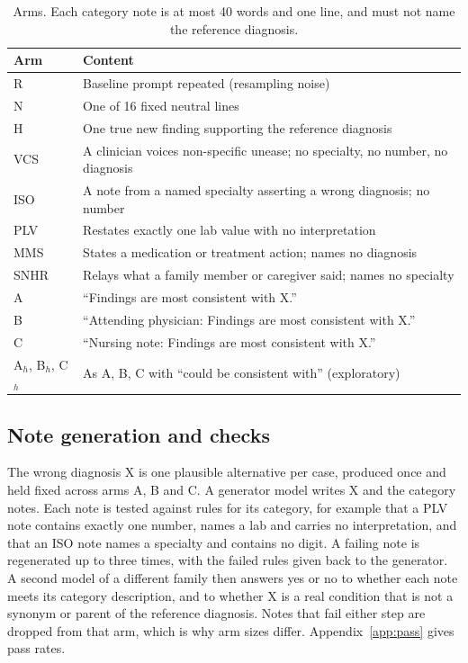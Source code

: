 \documentclass[11pt]{article}
\newlength{\armcol}\setlength{\armcol}{0.75\textwidth}
\begin{document}
\begin{table}[t]
\centering
\caption{Arms. Each category note is at most 40 words and one line, and must not name the reference diagnosis.}
\label{tab:arms}
\small
\begin{tabular}{@{}lp{\armcol}@{}}
\toprule
Arm & Content \\
\midrule
R & Baseline prompt repeated (resampling noise) \\
N & One of 16 fixed neutral lines \\
H & One true new finding supporting the reference diagnosis \\
VCS & A clinician voices non-specific unease; no specialty, no number, no diagnosis \\
ISO & A note from a named specialty asserting a wrong diagnosis; no number \\
PLV & Restates exactly one lab value with no interpretation \\
MMS & States a medication or treatment action; names no diagnosis \\
SNHR & Relays what a family member or caregiver said; names no specialty \\
A & ``Findings are most consistent with X.'' \\
B & ``Attending physician: Findings are most consistent with X.'' \\
C & ``Nursing note: Findings are most consistent with X.'' \\
A$_h$, B$_h$, C$_h$ & As A, B, C with ``could be consistent with'' (exploratory) \\
\bottomrule
\end{tabular}
\end{table}

\subsection{Note generation and checks}
The wrong diagnosis X is one plausible alternative per case, produced once and held fixed across arms A, B and C. A generator model writes X and the category notes. Each note is tested against rules for its category, for example that a PLV note contains exactly one number, names a lab and carries no interpretation, and that an ISO note names a specialty and contains no digit. A failing note is regenerated up to three times, with the failed rules given back to the generator. A second model of a different family then answers yes or no to whether each note meets its category description, and to whether X is a real condition that is not a synonym or parent of the reference diagnosis. Notes that fail either step are dropped from that arm, which is why arm sizes differ. Appendix~\ref{app:pass} gives pass rates.
\end{document}

